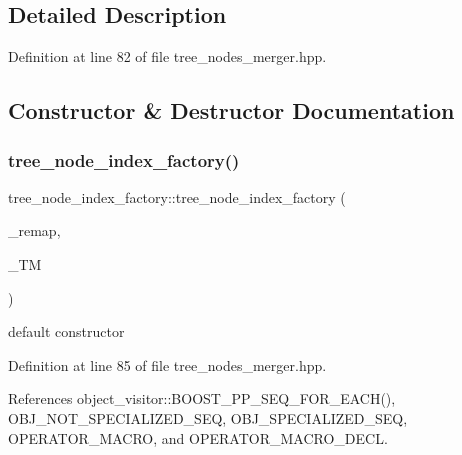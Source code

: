 \subsection{Detailed Description}


Definition at line 82 of file tree\+\_\+nodes\+\_\+merger.\+hpp.



\subsection{Constructor \& Destructor Documentation}
\mbox{\label{structtree__node__index__factory_ab7ae7b8d50387e481d2cc5f9f9004323}} 
\subsubsection{\texorpdfstring{tree\+\_\+node\+\_\+index\+\_\+factory()}{tree\_node\_index\_factory()}}
{\footnotesize\ttfamily tree\+\_\+node\+\_\+index\+\_\+factory\+::tree\+\_\+node\+\_\+index\+\_\+factory (\begin{DoxyParamCaption}\item[{\hyperlink{custom__map_8hpp_a8cbaceffc09790a885ec7e9c17809c69}{Custom\+Unordered\+Map\+Unstable}$<$ unsigned int, unsigned int $>$ \&}]{\+\_\+remap,  }\item[{const \hyperlink{tree__manager_8hpp_a96ff150c071ce11a9a7a1e40590f205e}{tree\+\_\+manager\+Ref}}]{\+\_\+\+TM }\end{DoxyParamCaption})\hspace{0.3cm}{\ttfamily [inline]}}



default constructor 



Definition at line 85 of file tree\+\_\+nodes\+\_\+merger.\+hpp.



References object\+\_\+visitor\+::\+B\+O\+O\+S\+T\+\_\+\+P\+P\+\_\+\+S\+E\+Q\+\_\+\+F\+O\+R\+\_\+\+E\+A\+C\+H(), O\+B\+J\+\_\+\+N\+O\+T\+\_\+\+S\+P\+E\+C\+I\+A\+L\+I\+Z\+E\+D\+\_\+\+S\+EQ, O\+B\+J\+\_\+\+S\+P\+E\+C\+I\+A\+L\+I\+Z\+E\+D\+\_\+\+S\+EQ, O\+P\+E\+R\+A\+T\+O\+R\+\_\+\+M\+A\+C\+RO, and O\+P\+E\+R\+A\+T\+O\+R\+\_\+\+M\+A\+C\+R\+O\+\_\+\+D\+E\+CL.

